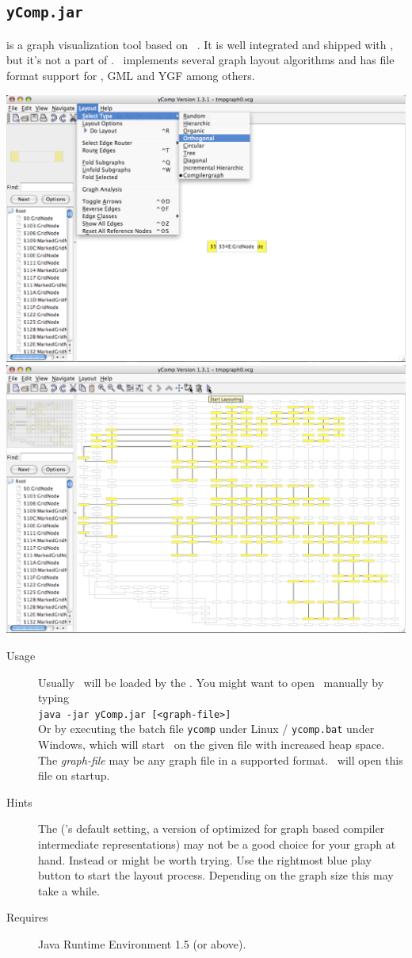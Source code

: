 \subsection{\texttt{yComp.jar}}
\label{tools:ycomp}
\yComp{} \cite{ycomp} is a graph visualization tool based on \yFiles\ \cite{yfiles}.
It is well integrated and shipped with \GrG, but it's not a part of \GrG.
\yComp\ implements several graph layout algorithms and has file format support for , GML and YGF among others.
\begin{center}
\includegraphics[width=0.45\linewidth]{fig/ycomp1.pdf} \includegraphics[width=0.45\linewidth]{fig/ycomp2.pdf}
\end{center}
\begin{description}
  \item[Usage] Usually \yComp\ will be loaded by the \GrShell. You might want to open \yComp\ manually by typing\\
   \texttt{java -jar yComp.jar [<graph-file>]}\\
  Or by executing the batch file \texttt{ycomp} under Linux / \texttt{ycomp.bat} under Windows,
  which will start \yComp\ on the given file with increased heap space.
  The \emph{graph-file} may be any graph file in a supported format. \yComp\ will open this file on startup.
  \item[Hints] The   (\yComp's default setting, a version of \texttt{} optimized for graph based compiler intermediate representations) may not be a good choice for your graph at hand.
  Instead \texttt{} or \texttt{} might be worth trying.
  Use the rightmost blue play button to start the layout process. Depending on the graph size this may take a while.
  \item[Requires] Java Runtime Environment 1.5 (or above).
\end{description}


